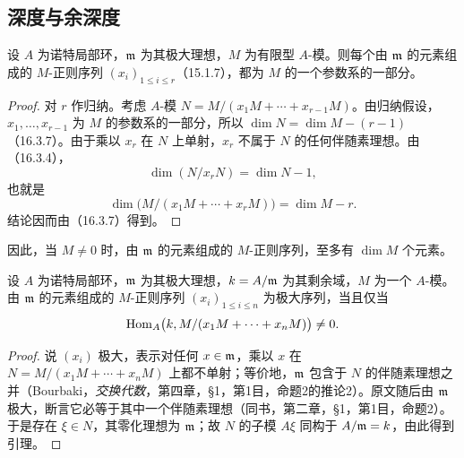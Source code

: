 \subsection{深度与余深度}

设 $A$ 为诺特局部环，$\mathfrak m$ 为其极大理想，$M$ 为有限型 $A$-模。则每个由 $\mathfrak m$ 的元素组成的 $M$-正则序列 $(x_i)_{1\leq i\leq r}$（15.1.7），都为 $M$ 的一个参数系的一部分。
\begin{proof}
对 $r$ 作归纳。考虑 $A$-模 $N=M/(x_1M+\cdots+x_{r-1}M)$。由归纳假设，$x_1,\ldots,x_{r-1}$ 为 $M$ 的参数系的一部分，所以 $\dim N=\dim M-(r-1)$（16.3.7）。由于乘以 $x_r$ 在 $N$ 上单射，$x_r$ 不属于 $N$ 的任何伴随素理想。由（16.3.4），
\[
 \dim(N/x_rN)=\dim N-1,
\]
也就是
\[
 \dim\bigl(M/(x_1M+\cdots+x_rM)\bigr)=\dim M-r.
\]
结论因而由（16.3.7）得到。
\end{proof}
因此，当 $M\ne0$ 时，由 $\mathfrak m$ 的元素组成的 $M$-正则序列，至多有 $\dim M$ 个元素。

设 $A$ 为诺特局部环，$\mathfrak m$ 为其极大理想，$k=A/\mathfrak m$ 为其剩余域，$M$ 为一个 $A$-模。由 $\mathfrak m$ 的元素组成的 $M$-正则序列 $(x_i)_{1\leq i\leq n}$ 为极大序列，当且仅当
\[
 \operatorname{Hom}_A\bigl(k,M/(x_1M+\cdots+x_nM)\bigr)\ne0.
\]
\begin{proof}
说 $(x_i)$ 极大，表示对任何 $x\in\mathfrak m$，乘以 $x$ 在
$N=M/(x_1M+\cdots+x_nM)$ 上都不单射；等价地，$\mathfrak m$ 包含于 $N$ 的伴随素理想之并（Bourbaki，\textit{交换代数}，第四章，§1，第1目，命题2的推论2）。原文随后由 $\mathfrak m$ 极大，断言它必等于其中一个伴随素理想（同书，第二章，§1，第1目，命题2）。于是存在 $\xi\in N$，其零化理想为 $\mathfrak m$；故 $N$ 的子模 $A\xi$ 同构于 $A/\mathfrak m=k$，由此得到引理。
\end{proof}

